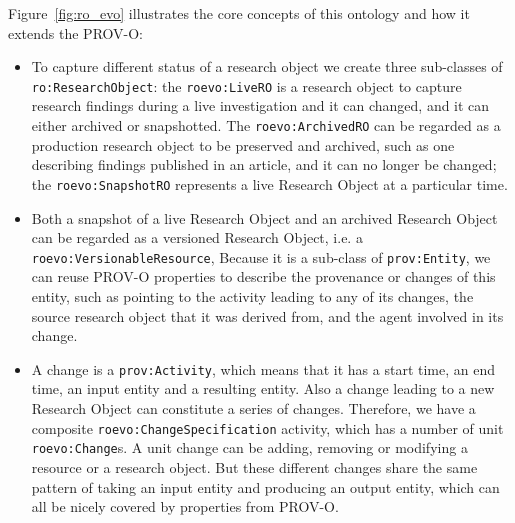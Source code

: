 Figure~\ref{fig:ro_evo} illustrates the core concepts of this ontology and how it extends the PROV-O:
\begin{itemize}
\item To capture different status of a research object we create three sub-classes of \texttt{ro:ResearchObject}: the \texttt{roevo:LiveRO} is a research object to capture research findings during a live investigation and it can changed, and it can either archived or snapshotted. The \texttt{roevo:ArchivedRO} can be regarded as a production research object to be preserved and archived, such as one describing findings published in an article, and it can no longer be changed; the \texttt{roevo:SnapshotRO} represents a live Research Object at a particular time.
\item Both a snapshot of a live Research Object and an archived Research Object can be regarded as a versioned Research Object, i.e. a \texttt{roevo:VersionableResource}, Because it is a sub-class of \texttt{prov:Entity}, we can reuse PROV-O properties to describe the provenance or changes of this entity, such as pointing to the activity leading to any of its changes, the source research object that it was derived from, and the agent involved in its change.
\item A change is a \texttt{prov:Activity}, which means that it has a start time, an end time, an input entity and a resulting entity. Also a change leading to a new Research Object can constitute a series of changes. Therefore, we have a composite \texttt{roevo:ChangeSpecification} activity, which has a number of unit \texttt{roevo:Change}s. A unit change can be adding, removing or modifying a resource or a research object. But these different changes share the same pattern of taking an input entity and producing an output entity, which can all be nicely covered by properties from PROV-O.
\end{itemize}
